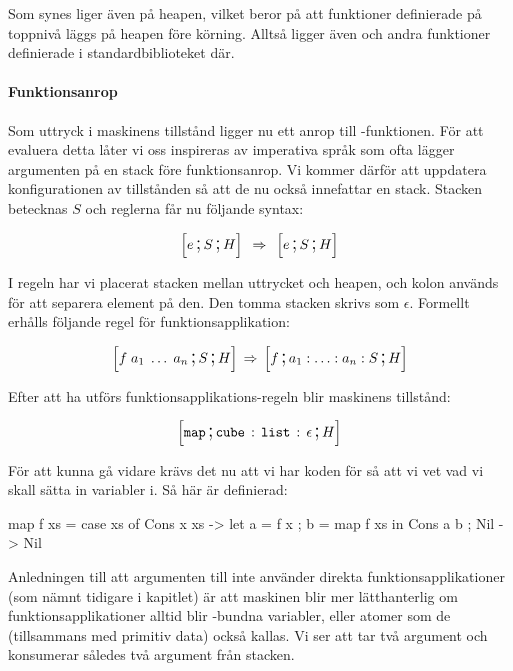 \documentclass[../Core]{subfiles}
\begin{document}
Som synes liger även   på heapen, vilket
beror på att funktioner definierade på toppnivå läggs på heapen före körning.
Alltså ligger även  och andra funktioner definierade
i standardbiblioteket där.

\paragraph{Funktionsanrop} Som uttryck i maskinens tillstånd ligger nu ett anrop till
-funktionen. %
För att evaluera detta låter vi oss inspireras av imperativa språk som ofta lägger argumenten
på en stack före funktionsanrop. Vi kommer därför att uppdatera konfigurationen av tillstånden så att de
nu också innefattar en stack. Stacken betecknas $S$ och reglerna får nu följande syntax:

\begin{equation*} 
\text{\large$$}\Big[e \,\text{\Large;}\, S \,\text{\Large;}\, H\Big] \; \,\Rightarrow\, \; \text{\large$$}\Big[e \,\text{\Large;}\, S \,\text{\Large;}\, H\Big]
\end{equation*} 

I regeln har vi placerat stacken mellan uttrycket och heapen, och kolon används
för att separera element på den. Den tomma stacken skrivs som $\epsilon$.
Formellt erhålls följande regel för funktionsapplikation:

\[
\text{\large$$}\Big[f\; a_{1}\;\ldots\; a_{n}\,\text{\Large;}\, S \,\text{\Large;}\, H\Big]\,\Rightarrow\, \text{\large$$}\Big[f\,\text{\Large;}\, a_{1}:\ldots:a_{n}:S\,\text{\Large;}\, H\Big]
\]


Efter att ha utförs funktionsapplikations-regeln blir maskinens tillstånd:

\[
\text{\large$$}\Big[\mathtt{map} \,\text{\Large;}\, \mathtt{cube} \,:\, \mathtt{list} \,:\, \epsilon \,\text{\Large;}\, H\Big]
\]

För att kunna gå vidare krävs det nu att vi har koden för  så att vi vet
vad vi skall sätta in variabler i. Så här är  definierad:


\begin{codeEx}
map f xs = case xs of
    { Cons x xs -> let { a = f x
                       ; b = map f xs
                       } in Cons a b
    ; Nil       -> Nil
    }
\end{codeEx}

Anledningen till att argumenten till  inte använder direkta funktionsapplikationer 
(som nämnt tidigare i kapitlet)
är att maskinen blir mer lätthanterlig om funktionsapplikationer alltid
blir -bundna variabler, eller atomer som de (tillsammans med primitiv data)
också kallas. Vi ser att  tar två argument och konsumerar således två
argument från stacken.
\end{document}
